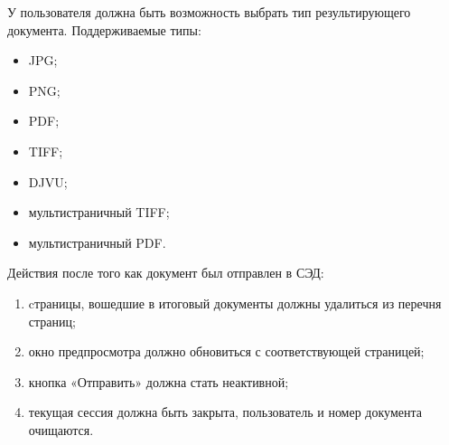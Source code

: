 У пользователя должна быть возможность выбрать тип результирующего документа. Поддерживаемые типы:
\begin{itemize}
	\item JPG;
	\item PNG;
	\item PDF;
	\item TIFF;
	\item DJVU;
	\item мультистраничный TIFF;
	\item мультистраничный PDF.
\end{itemize}

Действия после того как документ был отправлен в СЭД:
\begin{enumerate}
	\item cтраницы, вошедшие в итоговый документы должны удалиться из перечня страниц; 
	\item окно предпросмотра должно обновиться с соответствующей страницей; 
	\item кнопка «Отправить» должна стать неактивной;
	\item текущая сессия должна быть закрыта, пользователь и номер документа очищаются.
\end{enumerate}

